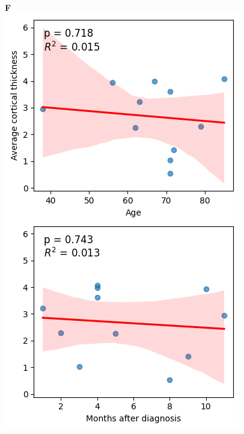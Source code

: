 \documentclass{standalone}
\begin{document}
\begin{minipage}[t]{0.2\textwidth}
    \textbf{F}\\[4pt]
    \includegraphics[width=\textwidth]{graphics/linreg_age_mad.png}
\end{minipage}
\end{document}
